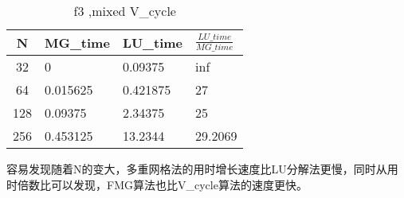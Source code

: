 \documentclass[12]{article}%
\begin{document}
\begin{table}[H]
    \centering
    \caption{f3 ,mixed V\_cycle}
    \begin{tabular}{|c|l|l|l|}
    \hline
    N & MG\_time       & LU\_time     & $\frac{LU\_time}{MG\_time}$    \\ \hline 
    32 & 0 & 0.09375 & inf\\ \hline 
    64 & 0.015625 & 0.421875 & 27\\ \hline 
    128 & 0.09375 & 2.34375 & 25\\ \hline 
    256 & 0.453125 & 13.2344 & 29.2069\\ \hline
\end{tabular}

 容易发现随着N的变大，多重网格法的用时增长速度比LU分解法更慢，同时从用时倍数比可以发现，FMG算法也比V\_cycle算法的速度更快。

\end{table}
\end{document}
